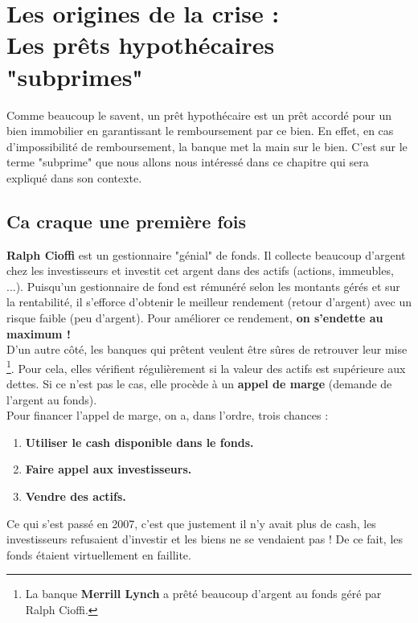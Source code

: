 
\chapter{Les origines de la crise : \\ Les prêts hypothécaires "subprimes"}
Comme beaucoup le savent, un prêt hypothécaire est un prêt accordé pour un bien immobilier en garantissant le remboursement par ce bien. En effet, en cas d'impossibilité de remboursement, la banque met la main sur le bien. C'est sur le terme "subprime" que nous allons nous intéressé dans ce chapitre qui sera expliqué dans son contexte.

\section{Ca craque une première fois}
\textbf{Ralph Cioffi} est un gestionnaire "génial" de fonds. Il collecte beaucoup d'argent chez les investisseurs et investit cet argent dans des actifs (actions, immeubles, ...). Puisqu'un gestionnaire de fond est rémunéré selon les montants gérés et sur la rentabilité, il s'efforce d'obtenir le meilleur rendement (retour d'argent) avec un risque faible (peu d'argent). Pour améliorer ce rendement, \textbf{on s'endette au maximum !} \\
D'un autre côté, les banques qui prêtent veulent être sûres de retrouver leur mise \footnote{La banque \textbf{Merrill Lynch} a prêté beaucoup d'argent au fonds géré par Ralph Cioffi.}. Pour cela, elles vérifient régulièrement si la valeur des actifs est supérieure aux dettes. Si ce n'est pas le cas, elle procède à un \textbf{appel de marge} (demande de l'argent au fonds). \\

Pour financer l'appel de marge, on a, dans l'ordre, trois chances :
\begin{enumerate}
\item \textbf{Utiliser le cash disponible dans le fonds.}
\item \textbf{Faire appel aux investisseurs.}
\item \textbf{Vendre des actifs.}
\end{enumerate}

Ce qui s'est passé en 2007, c'est que justement il n'y avait plus de cash, les investisseurs refusaient d'investir et les biens ne se vendaient pas ! De ce fait, les fonds étaient virtuellement en faillite. \\

